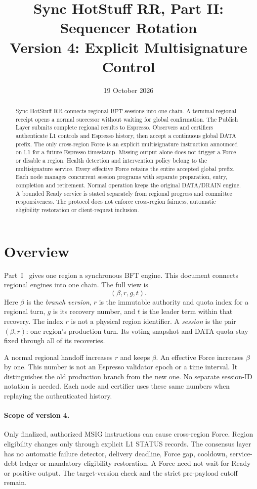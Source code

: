 \documentclass[11pt,a4paper]{article}
\title{Sync HotStuff RR, Part II: Sequencer Rotation\\\large Version 4: Explicit Multisignature Control}
\author{}\date{19 October 2026}
\newcommand{\defterm}[1]{\textcolor{rrBlue}{\textit{#1}}}
\newcounter{protocol}
\begin{document}
\maketitle
\begin{abstract}
Sync HotStuff RR connects regional BFT sessions into one chain.
A terminal regional receipt opens a normal successor without waiting
for global confirmation. The Publish Layer submits complete regional
results to Espresso. Observers and certifiers authenticate L1 controls
and Espresso history, then accept a continuous global DATA prefix.
The only cross-region Force is an explicit multisignature instruction
announced on L1 for a future Espresso timestamp. Missing output alone
does not trigger a Force or disable a region. Health detection and
intervention policy belong to the multisignature service.
Every effective Force retains the entire accepted global prefix.
Each node manages concurrent session programs with separate preparation,
entry, completion and retirement. Normal operation keeps the original
DATA/DRAIN engine. A bounded Ready service is stated separately from
regional progress and committee responsiveness. The protocol does not
enforce cross-region fairness, automatic eligibility restoration or
client-request inclusion.
\end{abstract}

\section{Overview}
\label{sec:overview}
Part~I~\cite{part1} gives one region a synchronous BFT engine.
This document connects regional engines into one chain. The full view is
\[
 (\beta,r,g,t).
\]
Here $\beta$ is the \defterm{branch version}, $r$ is the immutable
authority and quota index for a regional turn, $g$ is its recovery
number, and $t$ is the leader term within that recovery. The index $r$
is not a physical region identifier. A \defterm{session} is the pair
$(\beta,r)$: one region's production turn. Its voting snapshot and DATA
quota stay fixed through all of its recoveries.

A normal regional handoff increases $r$ and keeps $\beta$.
An effective Force increases $\beta$ by one. This number is not an
Espresso validator epoch or a time interval. It distinguishes the old
production branch from the new one. No separate session-ID notation is
needed. Each node and certifier uses these same numbers when replaying
the authenticated history.

\paragraph{Scope of version 4.}
Only finalized, authorized MSIG instructions can cause cross-region
Force. Region eligibility changes only through explicit L1 STATUS
records. The consensus layer has no automatic failure detector, delivery
deadline, Force gap, cooldown, service-debt ledger or mandatory
eligibility restoration. A Force need not wait for Ready or positive
output. The target-version check and the strict pre-payload cutoff remain.
\end{document}

